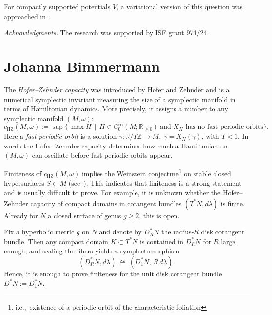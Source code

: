 \documentclass[11pt]{article}
\theoremstyle{definition}
\begin{document}
For compactly supported potentials $V$, a variational version of this question was approached in \cite{bialy-mackay}.

\bigskip

{\it Acknowledgments.} The research was supported by ISF grant 974/24.




\section*{Johanna Bimmermann}

The \emph{Hofer--Zehnder capacity} was introduced by Hofer and Zehnder \cite{HZ90} and is a numerical symplectic invariant measuring the size of a symplectic manifold in terms of Hamiltonian dynamics. More precisely, it assigns a number to any symplectic
manifold $(M,\omega)$:
$$
c_{\mathrm{HZ}}(M,\omega)
:= \sup\lbrace \, \max H \,\mid \, H\in C^\infty_0(M;\mathbb{R}_{\ge 0})\ \text{and $X_H$ has no fast periodic orbits} \rbrace.
$$
Here a \emph{fast periodic orbit} is a solution $\gamma:\mathbb{R}/T\mathbb{Z} \longrightarrow M,\ \dot\gamma = X_H(\gamma)$, with $T<1$. In words the Hofer--Zehnder capacity determines how much a Hamiltonian on $(M,\omega)$ can oscillate before fast periodic orbits appear.

Finiteness of $c_{\mathrm{HZ}}(M,\omega)$ implies the Weinstein
conjecture\footnote{i.e.,\ existence of a periodic orbit of the characteristic foliation} on stable
closed hypersurfaces $S\subset M$ (see~\cite[Ch.\ 4, Thm.\ 5]{HZ95}). This indicates that finiteness is a strong statement and is usually difficult to prove. For example, it is unknown whether the Hofer--Zehnder capacity of compact
domains in cotangent bundles $(T^{*}N,d\lambda)$ is finite. Already for $N$ a closed surface of genus $g\ge 2$, this is open.

Fix a hyperbolic metric $g$ on $N$ and denote by $D^{*}_{R}N$ the
radius-$R$ disk cotangent bundle. Then any compact domain
$K\subset T^{*}N$ is contained in $D^{*}_{R}N$ for $R$ large enough, and
scaling the fibers yields a symplectomorphism
$$
(D^{*}_{R}N,d\lambda)\;\cong\;(D^{*}_{1}N,\,R\,d\lambda).
$$
Hence, it is enough to prove finiteness for the unit disk cotangent bundle
$D^{*}N:=D^{*}_{1}N$.
\end{document}
